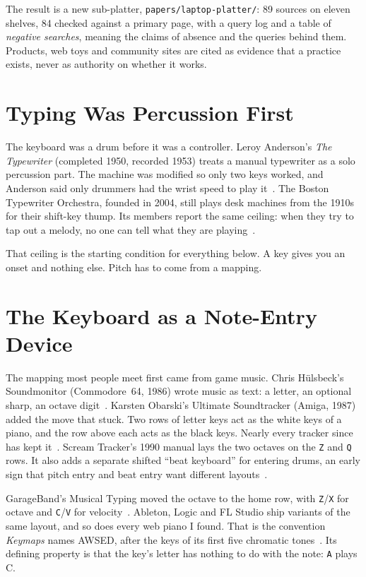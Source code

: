 \documentclass[10pt,letterpaper,twocolumn]{article}
\newcommand{\key}[1]{\texttt{#1}}
\begin{document}
The result is a new sub-platter, \texttt{papers/laptop-platter/}: 89 sources on eleven shelves, 84 checked against a primary page, with a query log and a table of \emph{negative searches}, meaning the claims of absence and the queries behind them. Products, web toys and community sites are cited as evidence that a practice exists, never as authority on whether it works.

\section{Typing Was Percussion First}

The keyboard was a drum before it was a controller. Leroy Anderson's \emph{The Typewriter} (completed 1950, recorded 1953) treats a manual typewriter as a solo percussion part. The machine was modified so only two keys worked, and Anderson said only drummers had the wrist speed to play it~\citep{anderson1950typewriter}. The Boston Typewriter Orchestra, founded in 2004, still plays desk machines from the 1910s for their shift-key thump. Its members report the same ceiling: when they try to tap out a melody, no one can tell what they are playing~\citep{bto2004}.

That ceiling is the starting condition for everything below. A key gives you an onset and nothing else. Pitch has to come from a mapping.

\section{The Keyboard as a Note-Entry Device}

The mapping most people meet first came from game music. Chris H\"ulsbeck's Soundmonitor (Commodore~64, 1986) wrote music as text: a letter, an optional sharp, an octave digit~\citep{borderie2023soundmonitor}. Karsten Obarski's Ultimate Soundtracker (Amiga, 1987) added the move that stuck. Two rows of letter keys act as the white keys of a piano, and the row above each acts as the black keys. Nearly every tracker since has kept it~\citep{cant2020trackers}. Scream Tracker's 1990 manual lays the two octaves on the \key{Z} and \key{Q} rows. It also adds a separate shifted ``beat keyboard'' for entering drums, an early sign that pitch entry and beat entry want different layouts~\citep{screamtracker1990}.

GarageBand's Musical Typing moved the octave to the home row, with \key{Z}/\key{X} for octave and \key{C}/\key{V} for velocity~\citep{owen2018musicaltyping}. Ableton, Logic and FL Studio ship variants of the same layout, and so does every web piano I found. That is the convention \emph{Keymaps} names AWSED, after the keys of its first five chromatic tones~\citep{scudder2026keymaps}. Its defining property is that the key's letter has nothing to do with the note: \key{A} plays C.
\end{document}

